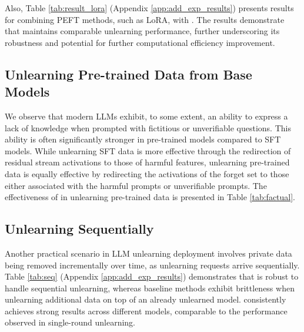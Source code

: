 Also, Table \ref{tab:result_lora} (Appendix \ref{app:add_exp_results}) presents results for combining PEFT methods, such as LoRA, with \lunar. The results demonstrate that \lunar maintains comparable unlearning performance, further underscoring its robustness and potential for further computational efficiency improvement.

%


\vspace{-2mm}
\subsection{Unlearning Pre-trained Data from Base Models} \label{sec:exp_factual}

We observe that modern LLMs exhibit, to some extent, an ability to express a lack of knowledge when prompted with fictitious or unverifiable questions. This ability is often significantly stronger in pre-trained models compared to SFT models. While unlearning SFT data is more effective through the redirection of residual stream activations to those of harmful features, unlearning pre-trained data is equally effective by redirecting the activations of the forget set to those either associated with the harmful prompts or unverifiable prompts. The effectiveness of \lunar in unlearning pre-trained data is presented in Table \ref{tab:factual}.



\subsection{Unlearning Sequentially} \label{sec:unlearn_seq}
Another practical scenario in LLM unlearning deployment involves private data being removed incrementally over time, as unlearning requests arrive sequentially. Table \ref{tab:seq} (Appendix \ref{app:add_exp_results}) demonstrates that \lunar is robust to handle sequential unlearning,  whereas baseline methods exhibit brittleness when unlearning additional data on top of an already unlearned model. \lunar consistently achieves strong results across different models, comparable to the performance observed in single-round unlearning.

%

